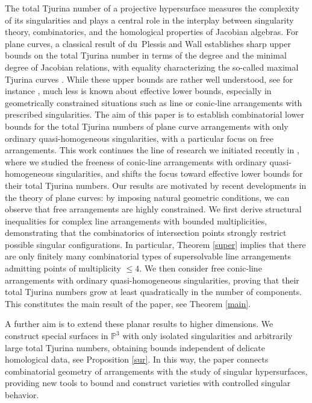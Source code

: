 \documentclass[11pt]{article}
\theoremstyle{plain}
\theoremstyle{definition}
\theoremstyle{remark}
\begin{document}
The total Tjurina number of a projective hypersurface measures the complexity of its singularities and plays a central role in the interplay between singularity theory, combinatorics, and the homological properties of Jacobian algebras. For plane curves, a classical result of du~Plessis and Wall establishes sharp upper bounds on the total Tjurina number in terms of the degree and the minimal degree of Jacobian relations, with equality characterizing the so-called maximal Tjurina curves \cite{DPP1}. While these upper bounds are rather well understood, see for instance \cite{Dimca1}, much less is known about effective lower bounds, especially in geometrically constrained situations such as line or conic-line arrangements with prescribed singularities.
The aim of this paper is to establish combinatorial lower bounds for the total Tjurina numbers of plane curve arrangements with only ordinary quasi-homogeneous singularities, with a particular focus on free arrangements. This work continues the line of research we initiated recently in \cite{Pok}, where we studied the freeness of conic-line arrangements with ordinary quasi-homogeneous singularities, and shifts the focus toward effective lower bounds for their total Tjurina numbers. Our results are motivated by recent developments in the theory of plane curves: by imposing natural geometric conditions, we can observe that free arrangements are highly constrained. We first derive structural inequalities for complex line arrangements with bounded multiplicities, demonstrating that the combinatorics of intersection points strongly restrict possible singular configurations. In particular, Theorem \ref{super} implies that there are only finitely many combinatorial types of supersolvable line arrangements admitting points of multiplicity $\leq 4$. We then consider free conic-line arrangements with ordinary quasi-homogeneous singularities, proving that their total Tjurina numbers grow at least quadratically in the number of components. This constitutes the main result of the paper, see Theorem \ref{main}.

A further aim is to extend these planar results to higher dimensions. We construct special surfaces in $\mathbb{P}^3$ with only isolated singularities and arbitrarily large total Tjurina numbers, obtaining bounds independent of delicate homological data, see Proposition \ref{sur}. In this way, the paper connects combinatorial geometry of arrangements with the study of singular hypersurfaces, providing new tools to bound and construct varieties with controlled singular behavior.
\end{document}

